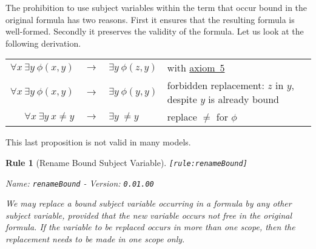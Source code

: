 \documentclass[a4paper,german,10pt,twoside]{book}
\newtheorem{rul}{Rule}
\theoremstyle{definition}
\theoremstyle{remark}
\begin{document}
The prohibition to use subject variables within the term that occur bound in the original formula has two reasons. First it ensures that the resulting formula is well-formed. Secondly it preserves the validity of the formula. Let us look at the following derivation.

\par
\begin{tabularx}{\linewidth}{rclX}
  $\forall x \ \exists y \ \phi(x, y)$ & $\rightarrow$ & $\exists y \ \phi(z,y)$ 
    & with \hyperlink{axiom:universalInstantiation}{axiom~5} \\
  $\forall x \ \exists y \ \phi(x, y)$ & $\rightarrow$ & $\exists y \ \phi(y,y)$ 
    & forbidden replacement: $z$ in $y$, despite $y$ is already bound \\
  $\forall x \ \exists y \ x \neq y$ & $\rightarrow$ & $\exists y \ \neq y$ 
    & replace $\neq$ for $\phi$
\end{tabularx}

\par
This last proposition is not valid in many models.


\begin{rul}[Rename Bound Subject Variable]
\label{rule:renameBound} \hypertarget{rule:renameBound}{}
{\tt \tiny [\verb]rule:renameBound]]}

\par
{\em   Name: \verb]renameBound]  -  Version: \verb]0.01.00]}


We may replace a bound subject variable occurring in a formula by any other subject variable, provided that the new variable occurs not free in the original formula. If the variable to be replaced occurs in more than one scope, then the replacement needs to be made in one scope only.
\end{rul}
\end{document}
